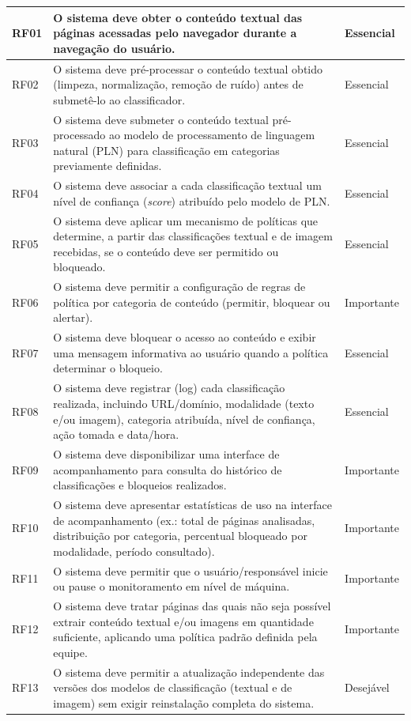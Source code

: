 \documentclass[
    12pt,           %
    oneside,        %
    a4paper,        %
    chapter=TITLE,  %
    english,        %
    brazil          %
]{abntex2}
\begin{document}
\begin{longtable}{|p{1.6cm}|p{9.8cm}|p{2.3cm}|}
RF01 & O sistema deve obter o conteúdo textual das páginas acessadas pelo navegador durante a navegação do usuário. & Essencial \\ \hline
RF02 & O sistema deve pré-processar o conteúdo textual obtido (limpeza, normalização, remoção de ruído) antes de submetê-lo ao classificador. & Essencial \\ \hline
RF03 & O sistema deve submeter o conteúdo textual pré-processado ao modelo de processamento de linguagem natural (PLN) para classificação em categorias previamente definidas. & Essencial \\ \hline
RF04 & O sistema deve associar a cada classificação textual um nível de confiança (\textit{score}) atribuído pelo modelo de PLN. & Essencial \\ \hline
RF05 & O sistema deve aplicar um mecanismo de políticas que determine, a partir das classificações textual e de imagem recebidas, se o conteúdo deve ser permitido ou bloqueado. & Essencial \\ \hline
RF06 & O sistema deve permitir a configuração de regras de política por categoria de conteúdo (permitir, bloquear ou alertar). & Importante \\ \hline
RF07 & O sistema deve bloquear o acesso ao conteúdo e exibir uma mensagem informativa ao usuário quando a política determinar o bloqueio. & Essencial \\ \hline
RF08 & O sistema deve registrar (log) cada classificação realizada, incluindo URL/domínio, modalidade (texto e/ou imagem), categoria atribuída, nível de confiança, ação tomada e data/hora. & Essencial \\ \hline
RF09 & O sistema deve disponibilizar uma interface de acompanhamento para consulta do histórico de classificações e bloqueios realizados. & Importante \\ \hline
RF10 & O sistema deve apresentar estatísticas de uso na interface de acompanhamento (ex.: total de páginas analisadas, distribuição por categoria, percentual bloqueado por modalidade, período consultado). & Importante \\ \hline
RF11 & O sistema deve permitir que o usuário/responsável inicie ou pause o monitoramento em nível de máquina. & Importante \\ \hline
RF12 & O sistema deve tratar páginas das quais não seja possível extrair conteúdo textual e/ou imagens em quantidade suficiente, aplicando uma política padrão definida pela equipe. & Importante \\ \hline
RF13 & O sistema deve permitir a atualização independente das versões dos modelos de classificação (textual e de imagem) sem exigir reinstalação completa do sistema. & Desejável \\ \hline

\end{longtable}
\end{document}
